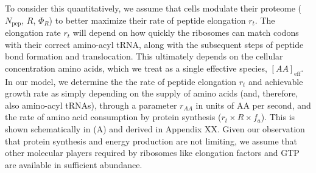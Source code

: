 
To consider this quantitatively, we assume that cells modulate their proteome
($N_\text{pep}$, $R$, $\Phi_R$) to better maximize their rate of peptide
elongation $r_t$. The elongation rate $r_t$ will depend on how quickly the ribosomes can
match codons with their correct amino-acyl tRNA, along with the subsequent steps
of peptide bond formation and translocation. This ultimately depends on the
cellular concentration amino acids, which we treat as a single effective
species, $[AA]_\text{eff}$. In our model, we determine the the rate of peptide
elongation $r_t$ and achievable growth rate as simply depending on the supply of
amino acids (and, therefore, also amino-acyl tRNAs), through a parameter
$r_{AA}$ in units of AA per second, and the rate of amino acid consumption by
protein synthesis ($r_t \times R \times f_a$). This is shown schematically in
(A) and derived in Appendix XX. Given our observation
that protein synthesis and energy production are not limiting, we
assume that other molecular players required by ribosomes like elongation
factors and GTP are available in sufficient abundance.

%


